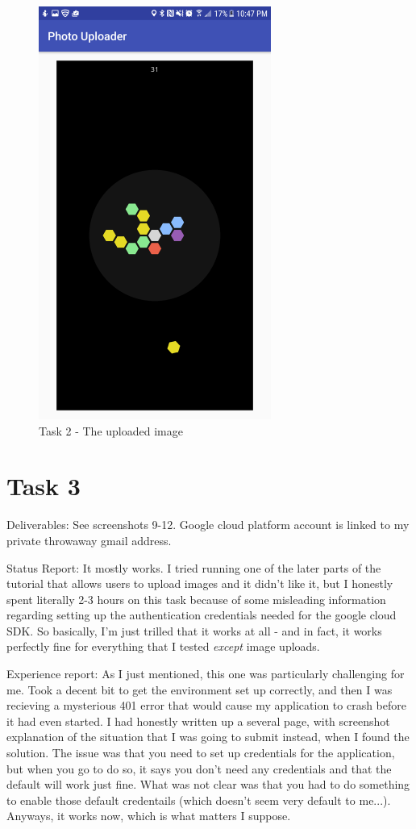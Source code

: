 \documentclass{article}
\begin{document}
	\begin{figure}[ht]
		\includegraphics[width=3in]{img/t2s4.png}
		\centering
		\caption{Task 2 - The uploaded image}
	\end{figure}


\clearpage
\section{Task 3}
Deliverables: See screenshots 9-12. Google cloud platform account is linked to my private throwaway gmail address.

Status Report: It mostly works. I tried running one of the later parts of the tutorial that allows users to upload images and it didn't like it, but I honestly spent literally 2-3 hours on this task because of some misleading information regarding setting up the authentication credentials needed for the google cloud SDK. So basically, I'm just trilled that it works at all - and in fact, it works perfectly fine for everything that I tested \textit{except} image uploads.

Experience report: As I just mentioned, this one was particularly challenging for me.
Took a decent bit to get the environment set up correctly, and then I was recieving a mysterious 401 error that would cause my application to crash before it had even started.
I had honestly written up a several page, with screenshot explanation of the situation that I was going to submit instead, when I found the solution.
The issue was that you need to set up credentials for the application, but when you go to do so, it says you don't need any credentials and that the default will work just fine.
What was not clear was that you had to do something to enable those default credentails (which doesn't seem very default to me...).
Anyways, it works now, which is what matters I suppose.
\end{document}
